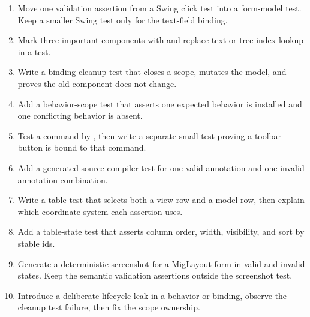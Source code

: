 \begin{exercisebox}
\begin{enumerate}
\item Move one validation assertion from a Swing click test into a form-model test. Keep a smaller Swing test only for the text-field binding.
\item Mark three important components with  and replace text or tree-index lookup in a test.
\item Write a binding cleanup test that closes a scope, mutates the model, and proves the old component does not change.
\item Add a behavior-scope test that asserts one expected behavior is installed and one conflicting behavior is absent.
\item Test a command by , then write a separate small test proving a toolbar button is bound to that command.
\item Add a generated-source compiler test for one valid annotation and one invalid annotation combination.
\item Write a table test that selects both a view row and a model row, then explain which coordinate system each assertion uses.
\item Add a table-state test that asserts column order, width, visibility, and sort by stable ids.
\item Generate a deterministic screenshot for a MigLayout form in valid and invalid states. Keep the semantic validation assertions outside the screenshot test.
\item Introduce a deliberate lifecycle leak in a behavior or binding, observe the cleanup test failure, then fix the scope ownership.
\end{enumerate}
\end{exercisebox}

